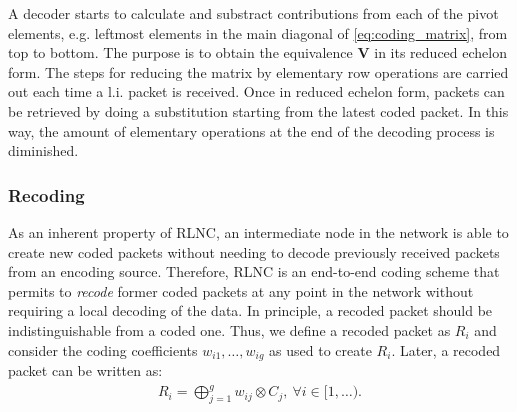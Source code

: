 A decoder starts to calculate and substract contributions from each
of the pivot elements, e.g. leftmost elements in the main diagonal of
\eqref{eq:coding_matrix}, from top to bottom. The purpose is to obtain
the equivalence  $\textbf{V}$ in its reduced echelon form. The steps
for reducing the matrix by elementary row operations are carried out each time
a \ac{l.i.} packet is received. Once in reduced echelon form, packets
can be retrieved by doing a substitution starting from the latest
coded packet. In this way, the amount of elementary operations at the end
of the decoding process is diminished.

\subsubsection{Recoding}
As an inherent property of \ac{RLNC}, an intermediate node in the network
is able to create new coded packets without needing to decode previously
received packets from an encoding source. Therefore, \ac{RLNC} is an end-to-end
coding scheme that permits to \textit{recode} former coded packets at any
point in the network without requiring a local decoding of the data. In
principle, a recoded packet should be indistinguishable from a coded one.
Thus, we define a recoded packet as $R_i$ and consider the coding
coefficients $w_{i1}, \ldots, w_{ig}$ as used to
create $R_i$. Later, a recoded packet can be written as:
%
\begin{align}
\label{eq:recoded_packet}
R_i = \bigoplus_{j=1}^{g} w_{ij} \otimes C_j  ,\ \forall i \in [1,\ldots).
\end{align}

